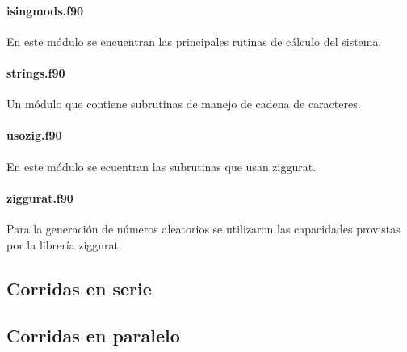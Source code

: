 \paragraph{isingmods.f90} 
En este m\'odulo  se encuentran las principales rutinas de c\'alculo del
sistema.


\paragraph{strings.f90}
Un m\'odulo que contiene subrutinas de manejo de cadena de caracteres.


\paragraph{usozig.f90} 
En este m\'odulo se ecuentran las subrutinas que usan ziggurat. 
					
					
\paragraph{ziggurat.f90}

Para la generaci\'on de n\'umeros aleatorios se utilizaron
las capacidades provistas por la librer\'ia ziggurat. 



\subsection{Corridas en serie}\label{serie}

\subsection{Corridas en paralelo}\label{paralelo}
